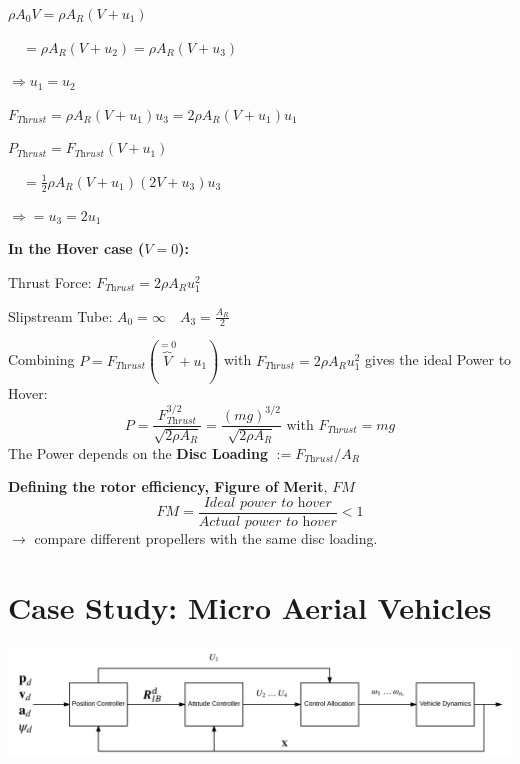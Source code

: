 \documentclass[fontsize=6pt,DIV=calc,a4paper,ngerman]{scrartcl}
\begin{document}
\begin{multicols*}{4}
\begin{minipage}{0.6\linewidth}
		$\rho A_0 V = \rho A_R (V+u_1)$

		$\quad = \rho A_R (V+u_2)= \rho A_R (V+u_3)$

		$\Rightarrow u_1=u_2$

		\smallskip
		$F_{\textit{Thrust}}
			= \rho A_R(V+u_1)u_3
			= 2\rho A_R(V+u_1)u_1 $

		$P_{\textit{Thrust}} = F_{\textit{Thrust}}(V+u_1) $

		$\quad= \frac{1}{2}\rho A_R(V+u_1)(2V+u_3)u_3$

		$\Rightarrow = u_3 = 2u_1$

		\smallskip
		\textbf{In the Hover case ($V=0$):}

		Thrust Force: $F_{\textit{Thrust}} = 2\rho A_Ru_1^2$

		Slipstream Tube: $A_0 = \infty \quad A_3 = \frac{A_R}{2}$
	\end{minipage}

	Combining $P=F_{\textit{Thrust}}(\overbrace{V}^{=0}+u_1)$ with $F_{\textit{Thrust}}=2\rho A_Ru_1^2$ gives the ideal Power to Hover:
	$$P=\frac{F_{\textit{Thrust}}^{3/2}}{\sqrt{2\rho A_R}} = \frac{(mg)^{3/2}}{\sqrt{2\rho A_R}} \text{ with } F_{\textit{Thrust}} = mg$$
	The Power depends on the \textbf{Disc Loading} $:=F_{\textit{Thrust}}/A_R$

	\smallskip
	\textbf{Defining the rotor efficiency, Figure of Merit}, $FM$\\
	$$FM = \frac{\textit{Ideal power to hover}}{\textit{Actual power to hover}}<1$$
	$\rightarrow$ compare different propellers with the same disc loading.

	\section{Case Study: Micro Aerial Vehicles}
	\includegraphics[width = \linewidth]{CaseControlArch.png}

\end{multicols*}
\end{document}
